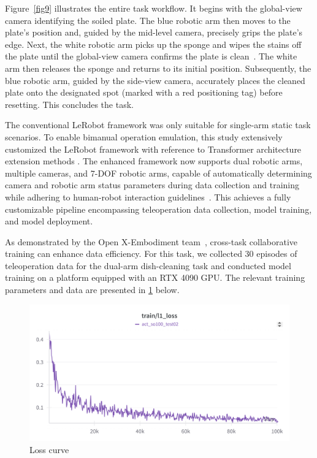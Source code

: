 \documentclass[runningheads]{llncs}
\begin{document}
Figure~\ref{fig9} illustrates the entire task workflow. It begins with the global-view camera identifying the soiled plate. The blue robotic arm then moves to the plate's position and, guided by the mid-level camera, precisely grips the plate's edge. Next, the white robotic arm picks up the sponge and wipes the stains off the plate until the global-view camera confirms the plate is clean~\cite{fu_deep_2022}. The white arm then releases the sponge and returns to its initial position. Subsequently, the blue robotic arm, guided by the side-view camera, accurately places the cleaned plate onto the designated spot (marked with a red positioning tag) before resetting. This concludes the task.


The conventional LeRobot framework was only suitable for single-arm static task scenarios. To enable bimanual operation emulation, this study extensively customized the LeRobot framework with reference to Transformer architecture extension methods . The enhanced framework now supports dual robotic arms, multiple cameras, and 7-DOF robotic arms, capable of automatically determining camera and robotic arm status parameters during data collection and training while adhering to human-robot interaction guidelines~\cite{ref15}. This achieves a fully customizable pipeline encompassing teleoperation data collection, model training, and model deployment.


As demonstrated by the Open X-Embodiment team~\cite{ref16}, cross-task collaborative training can enhance data efficiency. For this task, we collected 30 episodes of teleoperation data for the dual-arm dish-cleaning task and conducted model training on a platform equipped with an RTX 4090 GPU. The relevant training parameters and data are presented in \cref{fig19} below.


\begin{figure}[H]
\centering
\includegraphics[width=323pt]{20}
\caption{Loss curve} \label{fig19}
\end{figure}
\end{document}

